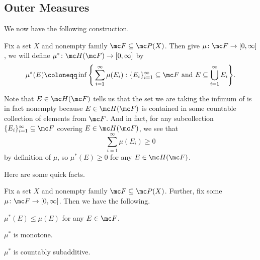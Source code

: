 \documentclass[../notes.tex]{subfiles}
\begin{document}
\subsection{Outer Measures}
We now have the following construction.
\begin{notation}
	Fix a set $X$ and nonempty family $\mc F\subseteq\mc P(X)$. Then give $\mu\colon\mc F\to[0,\infty]$, we will define $\mu^*\colon\mc H(\mc F)\to[0,\infty]$ by
	\[\mu^*(E)\coloneqq\inf\Bigg\{\sum_{i=1}^\infty\mu(E_i):\{E_i\}_{i=1}^\infty\subseteq\mc F\text{ and }E\subseteq\bigcup_{i=1}^\infty E_i\Bigg\}.\]
\end{notation}
\begin{remark}
	Note that $E\in\mc H(\mc F)$ tells us that the set we are taking the infimum of is in fact nonempty because $E\in\mc H(\mc F)$ is contained in some countable collection of elements from $\mc F$. And in fact, for any subcollection $\{E_i\}_{i=1}^\infty\subseteq\mc F$ covering $E\in\mc H(\mc F)$, we see that
	\[\sum_{i=1}^\infty\mu(E_i)\ge0\]
	by definition of $\mu$, so $\mu^*(E)\ge0$ for any $E\in\mc H(\mc F)$.
\end{remark}
Here are some quick facts.
\begin{lemma} \label{lem:hered-measure-facts}
	Fix a set $X$ and nonempty family $\mc F\subseteq\mc P(X)$. Further, fix some $\mu\colon\mc F\to[0,\infty]$. Then we have the following.
	\begin{listalph}
		\item $\mu^*(E)\le\mu(E)$ for any $E\in\mc F$.
		\item $\mu^*$ is monotone.
		\item $\mu^*$ is countably subadditive.
	\end{listalph}
\end{lemma}
\end{document}

